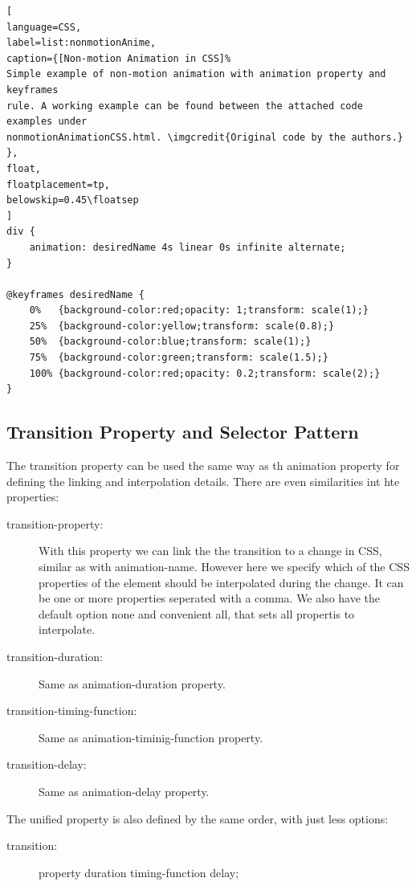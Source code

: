 \begin{lstlisting}[
language=CSS,
label=list:nonmotionAnime,
caption={[Non-motion Animation in CSS]%
Simple example of non-motion animation with animation property and keyframes 
rule. A working example can be found between the attached code examples under 
nonmotionAnimationCSS.html. \imgcredit{Original code by the authors.}
},
float,
floatplacement=tp,
belowskip=0.45\floatsep
]
div {
	animation: desiredName 4s linear 0s infinite alternate;
}

@keyframes desiredName {
	0%   {background-color:red;opacity: 1;transform: scale(1);}
	25%  {background-color:yellow;transform: scale(0.8);}
	50%  {background-color:blue;transform: scale(1);}
	75%  {background-color:green;transform: scale(1.5);}
	100% {background-color:red;opacity: 0.2;transform: scale(2);}
}
\end{lstlisting}

\subsection{Transition Property and Selector Pattern} %
\label{sub:CSS_transition}

The transition property can be used the same way as th animation property for 
defining the linking and interpolation details. There are even similarities int 
hte properties:

\begin{description}
\item [transition-property:] With this property we can link the the transition 
to a change in CSS, similar as with animation-name. However here we specify 
which of the CSS properties of the element should be interpolated during the 
change. It can be one or more properties seperated with a comma. We also have 
the default option none and convenient all, that sets all propertis to 
interpolate.
\item [transition-duration:] Same as animation-duration property.
\item [transition-timing-function:] Same as animation-timinig-function property.
\item [transition-delay:] Same as animation-delay property.
\end{description}

The unified property is also defined by the same order, with just less options:

\begin{description}
\item [transition:] property duration timing-function delay;
\end{description}

